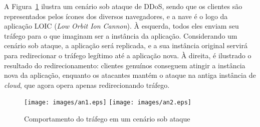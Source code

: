 A Figura~\ref{fig:cen} ilustra um cenário sob ataque de DDoS, sendo que os clientes são representados pelos ícones dos diversos navegadores, e a nave é o logo da aplicação LOIC (\emph{Low Orbit Ion Cannon}). À esquerda, todos eles enviam seu tráfego para o que imaginam ser a instância da aplicação. Considerando um cenário sob ataque, a aplicação será replicada, e a sua instância original servirá para redirecionar o tráfego legítimo até a aplicação nova. À direita, é ilustrado o resultado do redirecionamento: clientes genuínos conseguem atingir a instância nova da aplicação, enquanto os atacantes mantém o ataque na antiga instância de \emph{cloud}, que agora opera apenas redirecionando tráfego.


\begin{figure}[t!]
	\centering
	\texttt{[image: images/an1.eps]}
	\hskip 1cm
	\texttt{[image: images/an2.eps]}
	\caption{Comportamento do tráfego em um cenário sob ataque}
	\label{fig:cen}
\end{figure}
